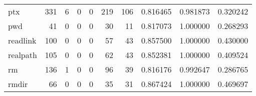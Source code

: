 \begin{longtable}{lrrrrrrrrr}
ptx       &                                       331 &                                                  6 &                                                  0 &                                                  0 &                                                219 &                                                106 &                                           0.816465 &                               0.981873 &                             0.320242 \\
pwd       &                                        41 &                                                  0 &                                                  0 &                                                  0 &                                                 30 &                                                 11 &                                           0.817073 &                               1.000000 &                             0.268293 \\
readlink  &                                       100 &                                                  0 &                                                  0 &                                                  0 &                                                 57 &                                                 43 &                                           0.857500 &                               1.000000 &                             0.430000 \\
realpath  &                                       105 &                                                  0 &                                                  0 &                                                  0 &                                                 62 &                                                 43 &                                           0.852381 &                               1.000000 &                             0.409524 \\
rm        &                                       136 &                                                  1 &                                                  0 &                                                  0 &                                                 96 &                                                 39 &                                           0.816176 &                               0.992647 &                             0.286765 \\
rmdir     &                                        66 &                                                  0 &                                                  0 &                                                  0 &                                                 35 &                                                 31 &                                           0.867424 &                               1.000000 &                             0.469697 \\

\end{longtable}
